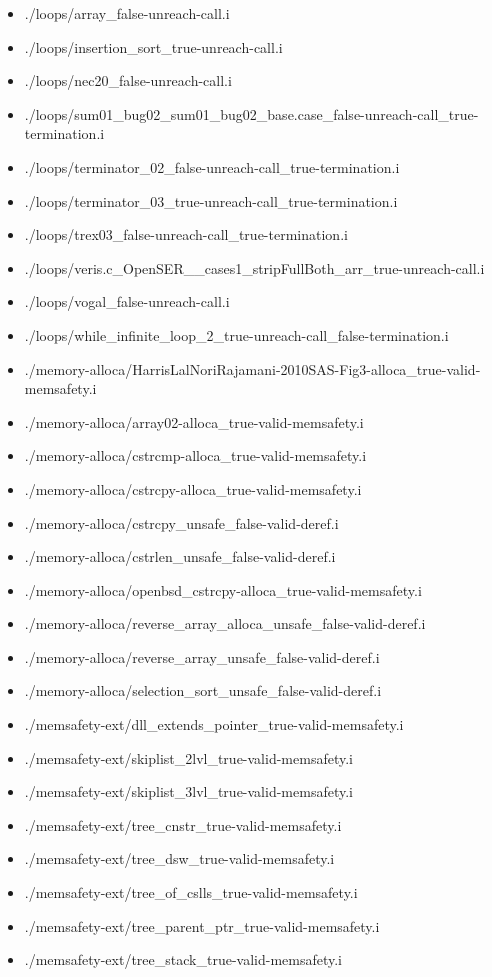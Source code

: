 \documentclass[envcountsame]{llncs}
\begin{document}
\begin{itemize}
\item ./loops/array\_false-unreach-call.i
\item ./loops/insertion\_sort\_true-unreach-call.i
\item ./loops/nec20\_false-unreach-call.i
\item ./loops/sum01\_bug02\_sum01\_bug02\_base.case\_false-unreach-call\_true-termination.i
\item ./loops/terminator\_02\_false-unreach-call\_true-termination.i
\item ./loops/terminator\_03\_true-unreach-call\_true-termination.i
\item ./loops/trex03\_false-unreach-call\_true-termination.i
\item ./loops/veris.c\_OpenSER\_\_cases1\_stripFullBoth\_arr\_true-unreach-call.i
\item ./loops/vogal\_false-unreach-call.i
\item ./loops/while\_infinite\_loop\_2\_true-unreach-call\_false-termination.i


\item ./memory-alloca/HarrisLalNoriRajamani-2010SAS-Fig3-alloca\_true-valid-memsafety.i
\item ./memory-alloca/array02-alloca\_true-valid-memsafety.i
\item ./memory-alloca/cstrcmp-alloca\_true-valid-memsafety.i
\item ./memory-alloca/cstrcpy-alloca\_true-valid-memsafety.i
\item ./memory-alloca/cstrcpy\_unsafe\_false-valid-deref.i
\item ./memory-alloca/cstrlen\_unsafe\_false-valid-deref.i
\item ./memory-alloca/openbsd\_cstrcpy-alloca\_true-valid-memsafety.i
\item ./memory-alloca/reverse\_array\_alloca\_unsafe\_false-valid-deref.i
\item ./memory-alloca/reverse\_array\_unsafe\_false-valid-deref.i
\item ./memory-alloca/selection\_sort\_unsafe\_false-valid-deref.i


\item ./memsafety-ext/dll\_extends\_pointer\_true-valid-memsafety.i
\item ./memsafety-ext/skiplist\_2lvl\_true-valid-memsafety.i
\item ./memsafety-ext/skiplist\_3lvl\_true-valid-memsafety.i
\item ./memsafety-ext/tree\_cnstr\_true-valid-memsafety.i
\item ./memsafety-ext/tree\_dsw\_true-valid-memsafety.i
\item ./memsafety-ext/tree\_of\_cslls\_true-valid-memsafety.i
\item ./memsafety-ext/tree\_parent\_ptr\_true-valid-memsafety.i
\item ./memsafety-ext/tree\_stack\_true-valid-memsafety.i



\end{itemize}
\end{document}
